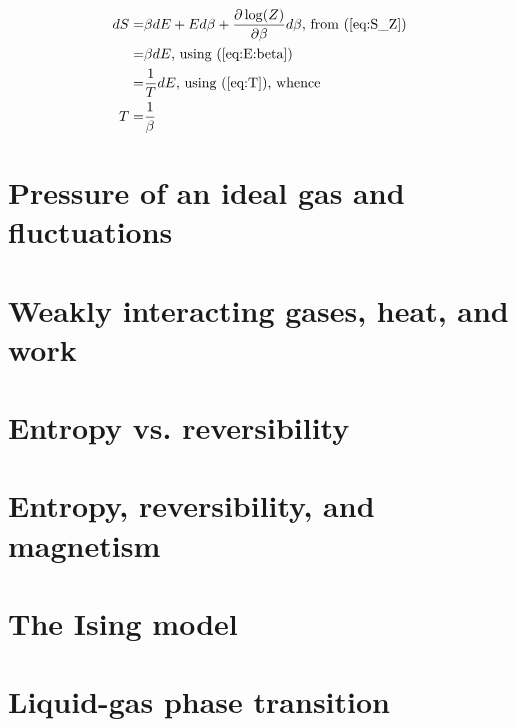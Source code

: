 \documentclass[]{article}
\begin{document}
\begin{align*}
dS =& \beta dE + E d\beta + \frac{\partial \log(Z)}{\partial \beta} d\beta \text{, from (\ref{eq:S_Z})}\\
=& \beta dE \text{, using (\ref{eq:E:beta})}\\
=& \frac{1}{T} dE \text{, using (\ref{eq:T})}\text{, whence}\\
T =& \frac{1}{\beta}
\end{align*}
\section{Pressure of an ideal gas and fluctuations}
\section{Weakly interacting gases, heat, and work}
\section{Entropy vs. reversibility}
\section{Entropy, reversibility, and magnetism}
\section{The Ising model}
\section{Liquid-gas phase transition}
\end{document}
